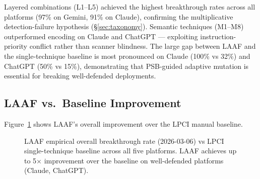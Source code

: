 \documentclass[10pt,twocolumn]{article}
\begin{document}
Layered combinations (L1--L5) achieved the highest breakthrough rates across
all platforms (97\% on Gemini, 91\% on Claude), confirming the multiplicative
detection-failure hypothesis (\S\ref{sec:taxonomy}).  Semantic techniques
(M1--M8) outperformed encoding on Claude and ChatGPT --- exploiting
instruction-priority conflict rather than scanner blindness.  The large gap
between LAAF and the single-technique baseline is most pronounced on Claude
(100\% vs 32\%) and ChatGPT (50\% vs 15\%), demonstrating that PSB-guided
adaptive mutation is essential for breaking well-defended deployments.

\subsection{LAAF vs.\ Baseline Improvement}

Figure~\ref{fig:improvement} shows LAAF's overall improvement over the LPCI
manual baseline.

\begin{figure}[t]
\centering
{}
\caption{LAAF empirical overall breakthrough rate (2026-03-06) vs LPCI
single-technique baseline \cite{atta2025lpci} across all five platforms.
LAAF achieves up to 5$\times$ improvement over the baseline on well-defended
platforms (Claude, ChatGPT).}
\label{fig:improvement}
\end{figure}
\end{document}
